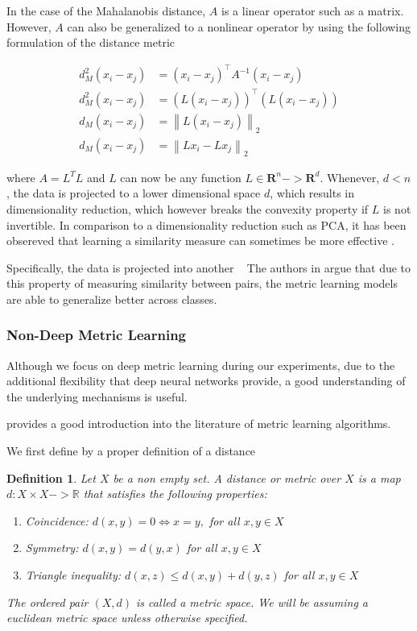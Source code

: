 \documentclass[a4paper,12pt,twoside,openright]{report}
\begin{document}
In the case of the Mahalanobis distance, $A$ is a linear operator such as a matrix.
However, $A$ can also be generalized to a nonlinear operator by using the following formulation of the distance metric

\begin{align}
d_{M}^{2}\left(x_{i}-x_{j}\right) &=\left(x_{i}-x_{j}\right)^{\top} A^{-1}\left(x_{i}-x_{j}\right) \\
d_{M}^{2}\left(x_{i}-x_{j}\right) &= (L\left(x_{i}-x_{j}\right))^{\top} (L\left(x_{i}-x_{j}\right)) \\
d_{M}\left(x_{i}-x_{j}\right) &=\left\|L\left(x_{i}-x_{j}\right)\right\|_{2} \\
d_{M}\left(x_{i}-x_{j}\right) &=\left\|Lx_{i}-Lx_{j}\right\|_{2}
\end{align}

where $A = L^T L$ and $L$ can now be any function $L \in \mathbf{R}^n -> \mathbf{R}^d$. 
Whenever, $d < n$, the data is projected to a lower dimensional space $d$, which results in dimensionality reduction, which however breaks the convexity property if $L$ is not invertible.
In comparison to a dimensionality reduction such as PCA, it has been obsereved that learning a similarity measure can sometimes be more effective \cite{chechik10}.

Specifically, the data is projected into another  \
The authors in \cite{moutafis17} argue that due to this property of measuring similarity between pairs, the metric learning models are able to generalize better across classes.

\subsubsection{Non-Deep Metric Learning}

Although we focus on deep metric learning during our experiments, due to the additional flexibility that deep neural networks provide, a good understanding of the underlying mechanisms is useful.

\cite{suarez19} provides a good introduction into the literature of metric learning algorithms.

We first define by a proper definition of a distance

\newtheorem{mydef}{Definition}
\begin{mydef}
Let $X$ be a non empty set. A \textit{distance} or \textit{metric} over $X$ is a map $d: X \times X -> \mathbb{R}$ that satisfies the following properties:

\begin{enumerate}
\item Coincidence: $d(x, y) = 0 \iff x = y,$ for all $x, y \in X$
\item Symmetry: $d(x, y) = d(y, x)$ for all $x, y \in X$
\item Triangle inequality: $d(x, z) \leq d(x, y) + d(y, z) $ for all $x, y \in X$
\end{enumerate}
The ordered pair $(X, d)$ is called a metric space. 
We will be assuming a euclidean metric space unless otherwise specified.
\end{mydef}
\end{document}
